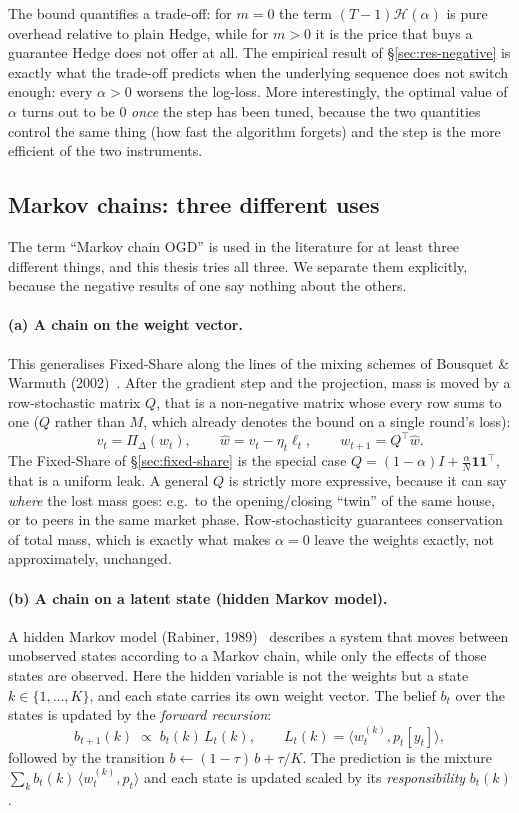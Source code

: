 \documentclass[12pt,a4paper,oneside]{report}
\renewcommand{\_}{\oldunderscore\allowbreak}
\theoremstyle{definition}
\theoremstyle{plain}
\theoremstyle{definition}   %
\begin{document}
The bound quantifies a trade-off: for $m=0$ the term $(T-1)\mathcal{H}(\alpha)$ is pure overhead
relative to plain Hedge, while for $m>0$ it is the price that buys a guarantee Hedge does not
offer at all. The empirical result of \S\ref{sec:res-negative} is exactly what the trade-off
predicts when the underlying sequence does not switch enough: every $\alpha>0$ worsens the
log-loss. More interestingly, the optimal value of $\alpha$ turns out to be $0$ \emph{once} the
step has been tuned, because the two quantities control the same thing (how fast the algorithm
forgets) and the step is the more efficient of the two instruments.

\subsection{Markov chains: three different uses}
\label{sec:markov-theory}

The term ``Markov chain OGD'' is used in the literature for at least three different things, and
this thesis tries all three. We separate them explicitly, because the negative results of one
say nothing about the others.

\paragraph{(a) A chain on the weight vector.} This generalises Fixed-Share along the lines of
the mixing schemes of Bousquet \& Warmuth (2002)~\cite{bousquetwarmuth2002}. After the gradient
step and the projection, mass is
moved by a row-stochastic matrix $Q$, that is a non-negative matrix whose every row sums to
one ($Q$ rather than $M$, which already denotes the bound on a single round's loss):
\[
v_t = \Pi_{\Delta}(w_t), \qquad \hat{w} = v_t - \eta_t \ell_t, \qquad w_{t+1} = Q^{\!\top}\hat{w}.
\]
The Fixed-Share of \S\ref{sec:fixed-share} is the special case
$Q = (1-\alpha)I + \tfrac{\alpha}{N}\mathbf{1}\mathbf{1}^{\!\top}$, that is a uniform leak. A
general $Q$ is strictly more expressive, because it can say \emph{where} the lost mass goes:
e.g.\ to the opening/closing ``twin'' of the same house, or to peers in the same market phase.
Row-stochasticity guarantees conservation of total mass, which is exactly what makes $\alpha=0$
leave the weights exactly, not approximately, unchanged.

\paragraph{(b) A chain on a latent state (hidden Markov model).} A hidden Markov model
(Rabiner, 1989)~\cite{rabiner1989} describes a system that moves between unobserved states
according to a Markov chain, while only the effects of those states are observed. Here the
hidden variable is not
the weights but a state $k\in\{1,\dots,K\}$, and each state carries its own weight vector. The
belief $b_t$ over the states is updated by the \emph{forward recursion}:
\[
b_{t+1}(k) \;\propto\; b_t(k)\, L_t(k), \qquad L_t(k) = \langle w^{(k)}_t, p_t[y_t]\rangle,
\]
followed by the transition $b \leftarrow (1-\tau)\,b + \tau/K$. The prediction is the mixture
$\sum_k b_t(k)\,\langle w^{(k)}_t, p_t\rangle$ and each state is updated scaled by its
\emph{responsibility} $b_t(k)$.
\end{document}

